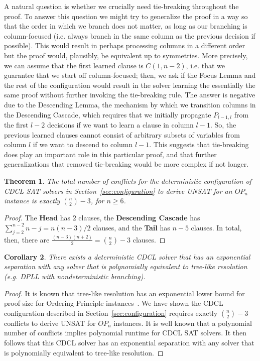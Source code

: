 \documentclass[10pt,a4paper]{article}
\newtheorem{theorem}{Theorem}
\newtheorem{corollary}[theorem]{Corollary}
\begin{document}
A natural question is whether we crucially need tie-breaking throughout the proof. To answer this question we might try to generalize the proof in a way so that the order in which we branch does not matter, as long as our branching is column-focused (i.e. always branch in the same column as the previous decision if possible). This would result in perhaps processing columns in a different order but the proof would, plausibly, be equivalent up to symmetries. More precisely, we can assume that the first learned clause is $C(1, n - 2)$, i.e. that we guarantee that we start off column-focused; then, we ask if the Focus Lemma and the rest of the configuration would result in the solver learning the essentially the same proof without further invoking the tie-breaking rule. The answer is negative due to the Descending Lemma, the mechanism by which we transition columns in the Descending Cascade, which requires that we initially propagate $P_{l - 1, l}$ from the first $l - 2$ decisions if we want to learn a clause in column $l - 1$. So, the previous learned clauses cannot consist of arbitrary subsets of variables from column $l$ if we want to descend to column $l - 1$.
This suggests that tie-breaking does play an important role in this particular proof, and that further generalizations that removed tie-breaking would be more complex if not longer.

\newpage

\begin{theorem}
The total number of conflicts for the deterministic configuration of CDCL SAT solvers in Section~\ref{sec:configuration} to derive UNSAT for an $OP_n$ instance is exactly $\binom{n}{2} - 3$, for $n \geq 6$.
\end{theorem}

\begin{proof}
    The \textbf{Head} has $2$ clauses, the \textbf{Descending Cascade} has $\sum_{j = 2}^{n - 2} n - j = n (n - 3) / 2$ clauses, and the \textbf{Tail} has $n - 5$ clauses. In total, then, there are $\frac{(n - 3) (n + 2)}{2} = \binom{n}{2} - 3$ clauses. 
\end{proof}


\begin{corollary}
There exists a deterministic CDCL solver that has an exponential separation with any solver that is polynomially equivalent to tree-like resolution (e.g. DPLL with nondeterministic branching). 
\end{corollary}

\begin{proof}
It is known that tree-like resolution has an exponential lower bound for proof size for Ordering Principle instances~\cite{bonet-galesi}. We have shown the CDCL configuration described in Section~\ref{sec:configuration} requires exactly $\binom{n}{2} - 3$ conflicts to derive UNSAT for $OP_n$ instances. It is well known that a polynomial number of conflicts implies polynomial runtime for CDCL SAT solvers. It then follows that this CDCL solver has an exponential separation with any solver that is polynomially equivalent to tree-like resolution.
\end{proof}
\end{document}
